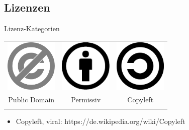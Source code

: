 \subsection{Lizenzen}
\label{sec:lizenzen}
\subsectionframe

\begin{frame}{Lizenz-Kategorien}
	\begin{center}
		\begin{tabular}{ccc}
		\includegraphics[width=2.5cm]{res/PD-icon.pdf} & \includegraphics[width=2.5cm]{res/by.pdf} & \includegraphics[width=2.5cm]{res/copyleft.pdf} \\ 
		Public Domain & Permissiv & Copyleft \\
		\hspace{3cm} & \hspace{3cm} & \hspace{3cm} \\
		\end{tabular} 
	\end{center}
\end{frame}
\note
{
	\begin{itemize}
		\item Copyleft, viral: https://de.wikipedia.org/wiki/Copyleft
	\end{itemize}
}

